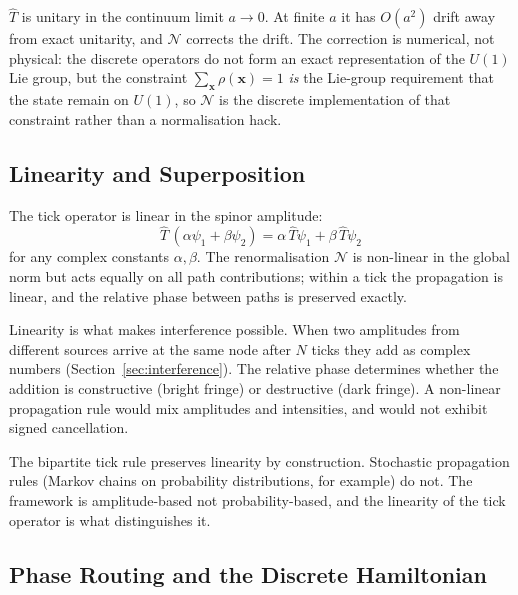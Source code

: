 $\hat{T}$ is unitary in the continuum limit $a \to 0$. At finite $a$
it has $O(a^2)$ drift away from exact unitarity, and $\mathcal{N}$
corrects the drift. The correction is numerical, not physical: the
discrete operators do not form an exact representation of the $U(1)$
Lie group, but the constraint $\sum_\mathbf{x} \rho(\mathbf{x}) = 1$
\emph{is} the Lie-group requirement that the state remain on $U(1)$,
so $\mathcal{N}$ is the discrete implementation of that constraint
rather than a normalisation hack.

\subsection{Linearity and Superposition}
\label{subsec:linearity}

The tick operator is linear in the spinor amplitude:
\begin{equation}
    \hat{T}\,(\alpha\psi_1 + \beta\psi_2) =
        \alpha\,\hat{T}\psi_1 + \beta\,\hat{T}\psi_2
    \label{eq:linearity}
\end{equation}
for any complex constants $\alpha, \beta$. The renormalisation
$\mathcal{N}$ is non-linear in the global norm but acts equally on
all path contributions; within a tick the propagation is linear, and
the relative phase between paths is preserved exactly.

Linearity is what makes interference possible. When two amplitudes
from different sources arrive at the same node after $N$ ticks they
add as complex numbers (Section~\ref{sec:interference}). The relative
phase determines whether the addition is constructive (bright fringe)
or destructive (dark fringe). A non-linear propagation rule would
mix amplitudes and intensities, and would not exhibit signed
cancellation.

The bipartite tick rule preserves linearity by construction.
Stochastic propagation rules (Markov chains on probability
distributions, for example) do not. The framework is amplitude-based
not probability-based, and the linearity of the tick operator is
what distinguishes it.

\subsection{Phase Routing and the Discrete Hamiltonian}
\label{subsec:phase_routing}

